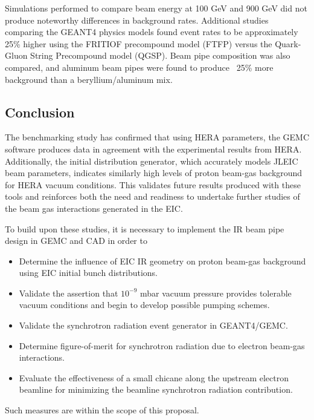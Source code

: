 Simulations  performed to compare beam energy at 100 GeV and 900 GeV did not produce noteworthy differences in background rates.  Additional studies comparing the GEANT4 physics models found event rates to be approximately 25\% higher using the FRITIOF precompound model (FTFP) versus the Quark-Gluon String Precompound model (QGSP).  Beam pipe composition was also compared, and aluminum beam pipes were found to produce ~25\% more background than a beryllium/aluminum mix.




\subsection{Conclusion}
The benchmarking study has confirmed that using HERA parameters, the GEMC software produces data in agreement with the experimental results from HERA.  Additionally, the initial distribution generator, which accurately models JLEIC beam parameters, indicates similarly high levels of proton beam-gas background for HERA vacuum conditions.  This validates future results produced with these tools and reinforces both the need and readiness to undertake further studies of the beam gas interactions generated in the EIC.  

To build upon these studies, it is necessary to implement the IR beam pipe design in GEMC and CAD in order to 

\begin{itemize}
	\item Determine the influence of EIC IR geometry on proton beam-gas background using EIC initial  bunch distributions.
	\item Validate the assertion that $10^{-9}$ mbar vacuum pressure provides tolerable vacuum conditions and begin to develop possible pumping schemes.
	\item Validate the synchrotron radiation event generator in GEANT4/GEMC.
	\item Determine figure-of-merit for synchrotron radiation due to electron beam-gas interactions.
	\item Evaluate the effectiveness of a small chicane along the upstream electron beamline for minimizing the beamline synchrotron radiation contribution.
\end{itemize}

Such measures are within the scope of this proposal.












